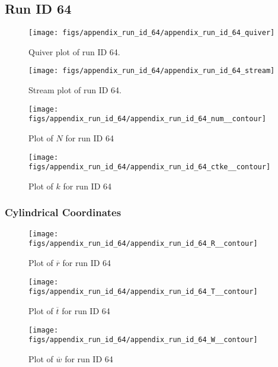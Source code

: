 \subsection{Run ID 64}
\begin{figure}[H]
\centering
\texttt{[image: figs/appendix\_run\_id\_64/appendix\_run\_id\_64\_quiver]}
\caption{Quiver plot of run ID 64.}
\label{fig:appendix_run_id_64_quiver}
\end{figure}


\begin{figure}[H]
\centering
\texttt{[image: figs/appendix\_run\_id\_64/appendix\_run\_id\_64\_stream]}
\caption{Stream plot of run ID 64.}
\label{fig:appendix_run_id_64_stream}
\end{figure}


\begin{figure}[H]
\centering
\texttt{[image: figs/appendix\_run\_id\_64/appendix\_run\_id\_64\_num\_\_contour]}
\caption{Plot of $N$ for run ID 64}
\label{fig:appendix_run_id_64_num__contour}
\end{figure}


\begin{figure}[H]
\centering
\texttt{[image: figs/appendix\_run\_id\_64/appendix\_run\_id\_64\_ctke\_\_contour]}
\caption{Plot of $k$ for run ID 64}
\label{fig:appendix_run_id_64_ctke__contour}
\end{figure}


\subsubsection{Cylindrical Coordinates}
\begin{figure}[H]
\centering
\texttt{[image: figs/appendix\_run\_id\_64/appendix\_run\_id\_64\_R\_\_contour]}
\caption{Plot of $\overline{r}$ for run ID 64}
\label{fig:appendix_run_id_64_R__contour}
\end{figure}


\begin{figure}[H]
\centering
\texttt{[image: figs/appendix\_run\_id\_64/appendix\_run\_id\_64\_T\_\_contour]}
\caption{Plot of $\overline{t}$ for run ID 64}
\label{fig:appendix_run_id_64_T__contour}
\end{figure}


\begin{figure}[H]
\centering
\texttt{[image: figs/appendix\_run\_id\_64/appendix\_run\_id\_64\_W\_\_contour]}
\caption{Plot of $\overline{w}$ for run ID 64}
\label{fig:appendix_run_id_64_W__contour}
\end{figure}


